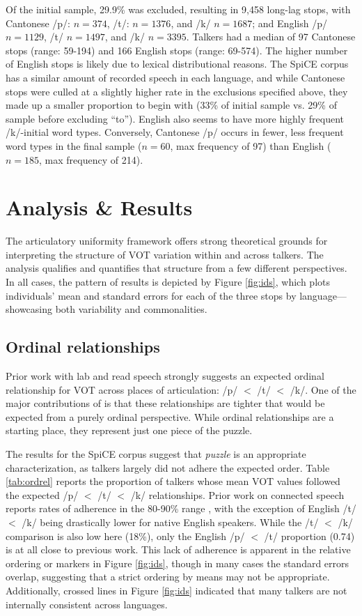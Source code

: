 Of the initial sample, 29.9\% was excluded, resulting in 9,458 long-lag stops, with Cantonese /p/: $n=374$, /t/: $n=1376$, and /k/ $n=1687$; and English /p/ $n=1129$, /t/ $n=1497$, and /k/ $n=3395$. Talkers had a median of 97 Cantonese stops (range: 59-194) and 166 English stops (range: 69-574). The higher number of English stops is likely due to lexical distributional reasons. The SpiCE corpus has a similar amount of recorded speech in each language, and while Cantonese stops were culled at a slightly higher rate in the exclusions specified above, they made up a smaller proportion to begin with (33\% of initial sample vs. 29\% of sample before excluding ``to''). English also seems to have more highly frequent /k/-initial word types. Conversely, Cantonese /p/ occurs in fewer, less frequent word types in the final sample ($n=60$, max frequency of 97) than English ($n=185$, max frequency of 214).

\section{Analysis \& Results}
The articulatory uniformity framework offers strong theoretical grounds for interpreting the structure of VOT variation within and across talkers. The analysis qualifies and quantifies that structure from a few different perspectives. In all cases, the pattern of results is depicted by Figure \ref{fig:ids}, which plots individuals' mean and standard errors for each of the three stops by language---showcasing both variability and commonalities.

\subsection{Ordinal relationships}
Prior work with lab and read speech strongly suggests an expected ordinal relationship for VOT across places of articulation: /p/ $<$ /t/ $<$ /k/. One of the major contributions of \citep{chodroff_2017_structure} is that these relationships are tighter that would be expected from a purely ordinal perspective. While ordinal relationships are a starting place, they represent just one piece of the puzzle. 

The results for the SpiCE corpus suggest that \textit{puzzle} is an appropriate characterization, as talkers largely did not adhere the expected order. Table \ref{tab:ordrel} reports the proportion of talkers whose mean VOT values followed the expected /p/ $<$ /t/ $<$ /k/ relationships. Prior work on connected speech reports rates of adherence in the 80-90\% range \citep{chodroff_2019_l2}, with the exception of English /t/ $<$ /k/ being drastically lower for native English speakers. While the /t/ $<$ /k/ comparison is also low here (18\%), only the English /p/ $<$ /t/ proportion (0.74) is at all close to previous work. This lack of adherence is apparent in the relative ordering or markers in Figure \ref{fig:ids}, though in many cases the standard errors overlap, suggesting that a strict ordering by means may not be appropriate. Additionally, crossed lines in Figure \ref{fig:ids} indicated that many talkers are not internally consistent across languages. 

